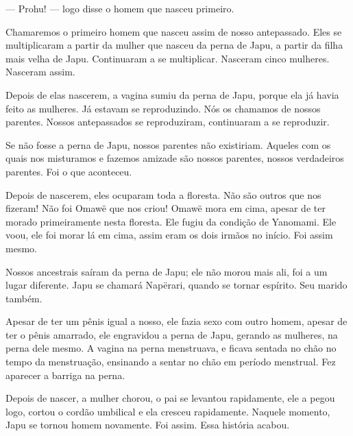 --- Prohu! --- logo disse o homem que nasceu primeiro. 

Chamaremos o primeiro homem que nasceu assim de nosso antepassado.
Eles se multiplicaram a partir da mulher que nasceu da perna de Japu, a
partir da filha mais velha de Japu. Continuaram a se multiplicar.
Nasceram cinco mulheres. Nasceram assim. 

Depois de elas nascerem, a vagina sumiu da perna de Japu, porque ela já
havia feito as mulheres. Já estavam se reproduzindo. Nós os chamamos de
nossos parentes. Nossos antepassados se reproduziram, continuaram a se
reproduzir. 

Se não fosse a perna de Japu, nossos parentes não existiriam. Aqueles
com os quais nos misturamos e fazemos amizade são nossos parentes,
nossos verdadeiros parentes. Foi o que aconteceu.

Depois de nascerem, eles ocuparam toda a floresta. Não são outros que
nos fizeram! Não foi Omawë que nos criou! Omawë mora em cima, apesar de
ter morado primeiramente nesta floresta. Ele fugiu da condição de
Yanomami. Ele voou, ele foi morar lá em cima, assim eram os dois irmãos
no início. Foi assim mesmo. 

Nossos ancestrais saíram da perna de Japu; ele não morou mais ali, foi a
um lugar diferente. Japu se chamará Napërari, quando se tornar
espírito. Seu marido também.

Apesar de ter um pênis igual a nosso, ele fazia sexo com outro homem,
apesar de ter o pênis amarrado, ele engravidou a perna de Japu, gerando
as mulheres, na perna dele mesmo. A vagina na perna menstruava, e ficava
sentada no chão no tempo da menstruação, ensinando a sentar no chão em
período menstrual. Fez aparecer a barriga na perna. 

Depois de nascer, a mulher chorou, o pai se levantou rapidamente, ele a
pegou logo, cortou o cordão umbilical e ela cresceu rapidamente. Naquele
momento, Japu se tornou homem novamente. Foi assim. Essa história
acabou.